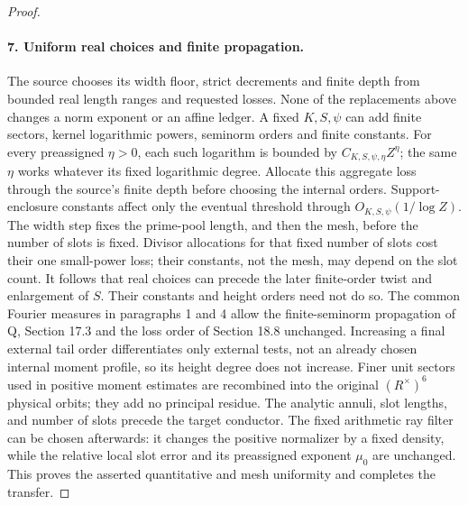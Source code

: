 \documentclass[11pt,a4paper]{article}
\theoremstyle{remark}\newtheorem{remark}[theorem]{Remark}
\numberwithin{equation}{section}
\begin{document}
\begin{proof}
\paragraph{7. Uniform real choices and finite propagation.}
The source chooses its width floor, strict decrements and
finite depth from bounded real length ranges and requested
losses. None of the replacements above changes a norm exponent
or an affine ledger. A fixed $K,S,\psi$ can add finite sectors,
kernel logarithmic powers, seminorm orders and finite constants.
For every preassigned $\eta>0$, each such logarithm is bounded
by $C_{K,S,\psi,\eta}Z^\eta$; the same $\eta$ works whatever
its fixed logarithmic degree. Allocate this aggregate loss
through the source's finite depth before choosing the internal
orders. Support-enclosure constants affect only the eventual
threshold through $O_{K,S,\psi}(1/\log Z)$.
The width step fixes the prime-pool length, and then the mesh,
before the number of slots is fixed. Divisor allocations for
that fixed number of slots cost their one small-power loss;
their constants, not the mesh, may depend on the slot count.
It follows that real choices can precede the later finite-order
twist and enlargement of $S$. Their constants and height orders
need not do so. The common Fourier measures in paragraphs 1
and 4 allow the finite-seminorm propagation of Q, Section 17.3
and the loss order of Section 18.8 unchanged. Increasing a final
external tail order differentiates only external tests, not an
already chosen internal moment profile, so its height degree
does not increase. Finer unit sectors used in positive moment estimates are recombined
into the original $(R^\times)^6$ physical orbits; they add no
principal residue. The analytic annuli, slot lengths, and number of slots precede
the target conductor. The fixed arithmetic ray filter can be
chosen afterwards: it changes the positive normalizer by a
fixed density, while the relative local slot error and its
preassigned exponent $\mu_0$ are unchanged. This proves the asserted
quantitative and mesh uniformity and completes the transfer.
\end{proof}
\end{document}
